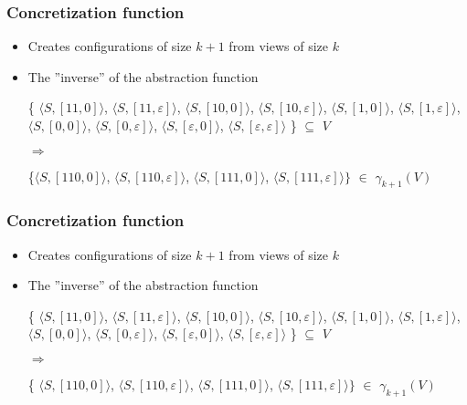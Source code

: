 \documentclass[handout]{beamer}
\begin{document}
\begin{frame}
  \frametitle{Concretization function}
  \begin{itemize}
  \item
    Creates configurations of size $k+1$ from views of size $k$
  \item
    The ''inverse'' of the abstraction function

    \begin{example}[$\gamma$ for ABP with $k=2$]

    \{
    {\color{red}$\langle S, [11, 0]\rangle$},
    {\color{red}$\langle S, [11, \varepsilon]\rangle$},
    $\langle S, [10, 0]\rangle$,
    $\langle S, [10, \varepsilon]\rangle$,
    {\color{red}$\langle S, [1, 0]\rangle$},
    {\color{red}$\langle S, [1,\varepsilon ]\rangle$},
    $\langle S,[0,0]\rangle$,
    $\langle S, [0,\varepsilon]\rangle$,
    {\color{red}$\langle S, [\varepsilon, 0]\rangle$},
    {\color{red}$\langle S, [\varepsilon, \varepsilon]\rangle$}
    \} $\subseteq$ $V$

    $\Rightarrow$

    \{$
    \langle S, [110,0]\rangle$,
    $\langle S, [110,\varepsilon]\rangle$,
    {\color{red}$\langle S, [111,0]\rangle$},
    $\langle S, [111,\varepsilon]\rangle\}$
    $\in$ $\gamma_{k+1}(V)$
    \end{example}
  \end{itemize}
\end{frame}

\begin{frame}
  \frametitle{Concretization function}
  \begin{itemize}
  \item
    Creates configurations of size $k+1$ from views of size $k$
  \item
    The ''inverse'' of the abstraction function

    \begin{example}[$\gamma$ for ABP with $k=2$]

    \{
    $\langle S, [11, 0]\rangle$,
    {\color{red}$\langle S, [11, \varepsilon]\rangle$},
    $\langle S, [10, 0]\rangle$,
    $\langle S, [10, \varepsilon]\rangle$,
    $\langle S, [1, 0]\rangle$,
    {\color{red}$\langle S, [1,\varepsilon ]\rangle$},
    $\langle S,[0,0]\rangle$,
    $\langle S, [0,\varepsilon]\rangle$,
    $\langle S, [\varepsilon, 0]\rangle$,
    {\color{red}$\langle S, [\varepsilon, \varepsilon]\rangle$}
    \} $\subseteq$ $V$

    $\Rightarrow$

    \{
    $\langle S, [110,0]\rangle$,
    $\langle S, [110,\varepsilon]\rangle$,
    $\langle S, [111,0]\rangle$,
    {\color{red}$\langle S, [111,\varepsilon]\rangle\}$}
    $\in$ $\gamma_{k+1}(V)$
    \end{example}
  \end{itemize}
\end{frame}
\end{document}
